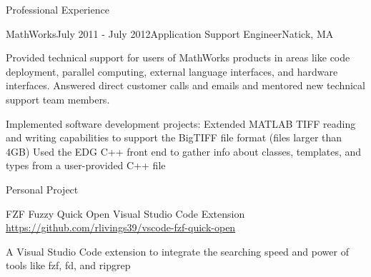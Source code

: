 \documentclass[
	usletter %
	10pt, %
]{resume} %
\begin{document}
\begin{rSection}{Professional Experience}

	\begin{rSubsection}{MathWorks}{July 2011 - July 2012}{Application Support Engineer}{Natick, MA}
		\item Provided technical support for users of MathWorks products in areas like code deployment, parallel computing, external language interfaces, and hardware interfaces.  Answered direct customer calls and emails and mentored new technical support team members.
		\item Implemented software development projects:
		\subitem Extended MATLAB TIFF reading and writing capabilities to support the BigTIFF file format (files larger than 4GB)
		\subitem Used the EDG C++ front end to gather info about classes, templates, and types from a user-provided C++ file
	\end{rSubsection}

\end{rSection}


\begin{rSection}{Personal Project}

\begin{rSubsection}{FZF Fuzzy Quick Open Visual Studio Code Extension\\ \url{https://github.com/rlivings39/vscode-fzf-quick-open}}{}{}{}
	\item A Visual Studio Code extension to integrate the searching speed and power of tools like fzf, fd, and ripgrep
\end{rSubsection}
\end{rSection}


\end{document}
